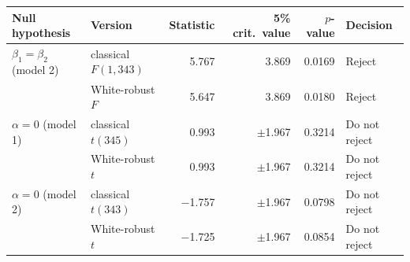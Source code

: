 \begin{tabular}{llrrrl}
\toprule
Null hypothesis & Version & Statistic & 5\% crit.\ value & $p$-value & Decision \\
\midrule
$\beta_1=\beta_2$ (model 2) & classical $F(1,343)$ & 5.767 & 3.869 & 0.0169 & Reject \\
 & White-robust $F$ & 5.647 & 3.869 & 0.0180 & Reject \\
\midrule
$\alpha=0$ (model 1) & classical $t(345)$ & 0.993 & $\pm$1.967 & 0.3214 & Do not reject \\
 & White-robust $t$ & 0.993 & $\pm$1.967 & 0.3214 & Do not reject \\
$\alpha=0$ (model 2) & classical $t(343)$ & \ensuremath{-}1.757 & $\pm$1.967 & 0.0798 & Do not reject \\
 & White-robust $t$ & \ensuremath{-}1.725 & $\pm$1.967 & 0.0854 & Do not reject \\
\bottomrule
\end{tabular}
